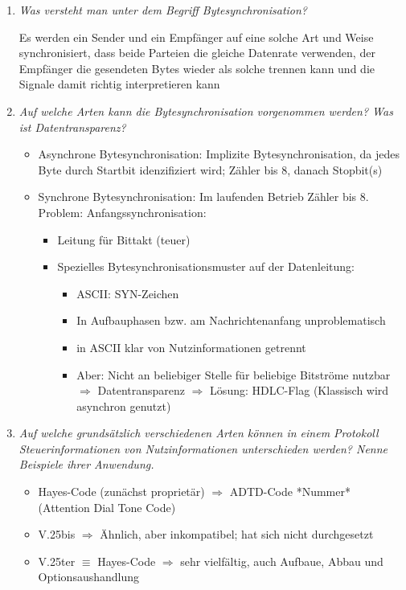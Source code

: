 \documentclass[hidelinks]{article}
\begin{document}
\begin{enumerate}
\item \textit{Was versteht man unter dem Begriff Bytesynchronisation?}

Es werden ein Sender und ein Empfänger auf eine solche Art und Weise synchronisiert, dass beide Parteien die gleiche Datenrate verwenden, der Empfänger die gesendeten Bytes wieder als solche trennen kann und die Signale damit richtig interpretieren kann

\item \textit{Auf welche Arten kann die Bytesynchronisation vorgenommen werden? Was ist Datentransparenz?}

\begin{itemize}
\item Asynchrone Bytesynchronisation: Implizite Bytesynchronisation, da jedes Byte durch Startbit idenzifiziert wird; Zähler bis 8, danach Stopbit(s)
\item Synchrone Bytesynchronisation: Im laufenden Betrieb Zähler bis 8. Problem: Anfangssynchronisation:
\begin{itemize}
	\item Leitung für Bittakt (teuer)
	\item Spezielles Bytesynchronisationsmuster auf der Datenleitung:
	\begin{itemize}
		\item ASCII: SYN-Zeichen
		\item In Aufbauphasen bzw. am Nachrichtenanfang unproblematisch
		\item in ASCII klar von Nutzinformationen getrennt
		\item Aber: Nicht an beliebiger Stelle für beliebige Bitströme nutzbar $\Rightarrow$ Datentransparenz $\Rightarrow$ Lösung: HDLC-Flag (Klassisch wird asynchron genutzt)
	\end{itemize}
\end{itemize}
\end{itemize}

\item \textit{Auf welche grundsätzlich verschiedenen Arten können in einem Protokoll Steuerinformationen von Nutzinformationen unterschieden werden? Nenne Beispiele ihrer Anwendung.}

\begin{itemize}
\item Hayes-Code (zunächst proprietär) $\Rightarrow$ ADTD-Code *Nummer* (Attention Dial Tone Code)
\item V.25bis $\Rightarrow$ Ähnlich, aber inkompatibel; hat sich nicht durchgesetzt
\item V.25ter $\equiv$ Hayes-Code $\Rightarrow$ sehr vielfältig, auch Aufbaue, Abbau und Optionsaushandlung
\end{itemize}
\end{enumerate}
\end{document}
